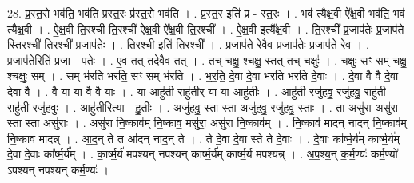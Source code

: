 \documentclass[17pt]{extarticle}
\begin{document}
28. प्र॒स्त॒रो भव॑ति॒ भव॑ति प्रस्त॒रः प्र॑स्त॒रो भव॑ति । . प्र॒स्त॒र इति॑ प्र - स्त॒रः । . भव॑ त्यैक्ष॒वी ऐ᳚क्ष॒वी भव॑ति॒ भव॑ त्यैक्ष॒वी । . ऐ॒क्ष॒वी ति॒रश्ची॑ ति॒रश्ची॑ ऐक्ष॒वी ऐ᳚क्ष॒वी ति॒रश्ची᳚ । . ऐ॒क्ष॒वी इत्यै᳚क्ष॒वी । . ति॒रश्ची᳚ प्र॒जाप॑तेः प्र॒जाप॑ते स्ति॒रश्ची॑ ति॒रश्ची᳚ प्र॒जाप॑तेः । . ति॒रश्ची॒ इति॑ ति॒रश्ची᳚ । . प्र॒जाप॑ते रे॒वैव प्र॒जाप॑तेः प्र॒जाप॑ते रे॒व । . प्र॒जाप॑ते॒रिति॑ प्र॒जा - प॒तेः॒ । . ए॒व तत् तदे॒वैव तत् । . तच् चक्षु॒ श्चक्षु॒ स्तत् तच् चक्षुः॑ । . चक्षुः॒ सꣳ सम् चक्षु॒ श्चक्षुः॒ सम् । . सम् भ॑रति भरति॒ सꣳ सम् भ॑रति । . भ॒र॒ति॒ दे॒वा दे॒वा भ॑रति भरति दे॒वाः । . दे॒वा वै वै दे॒वा दे॒वा वै । . वै या या वै वै याः । . या आहु॑ती॒ राहु॑ती॒र् या या आहु॑तीः । . आहु॑ती॒ रजु॑हवु॒ रजु॑हवु॒ राहु॑ती॒ राहु॑ती॒ रजु॑हवुः । . आहु॑ती॒रित्या - हु॒तीः॒ । . अजु॑हवु॒ स्ता स्ता अजु॑हवु॒ रजु॑हवु॒ स्ताः । . ता असु॑रा॒ असु॑रा॒ स्ता स्ता असु॑राः । . असु॑रा नि॒ष्काव॑म् नि॒ष्काव॒ मसु॑रा॒ असु॑रा नि॒ष्काव᳚म् । . नि॒ष्काव॑ मादन् नादन् नि॒ष्काव॑म् नि॒ष्काव॑ मादन्न् । . आ॒द॒न् ते त आ॑दन् नाद॒न् ते । . ते दे॒वा दे॒वा स्ते ते दे॒वाः । . दे॒वाः का᳚र्ष्म॒र्य॑म् कार्ष्म॒र्य॑म् दे॒वा दे॒वाः का᳚र्ष्म॒र्य᳚म् । . का॒र्ष्म॒र्य॑ मपश्यन् नपश्यन् कार्ष्म॒र्य॑म् कार्ष्म॒र्य॑ मपश्यन्न् । . अ॒प॒श्य॒न् क॒र्म॒ण्यः॑ कर्म॒ण्यो॑ ऽपश्यन् नपश्यन् कर्म॒ण्यः॑ । \newline
\end{document}
